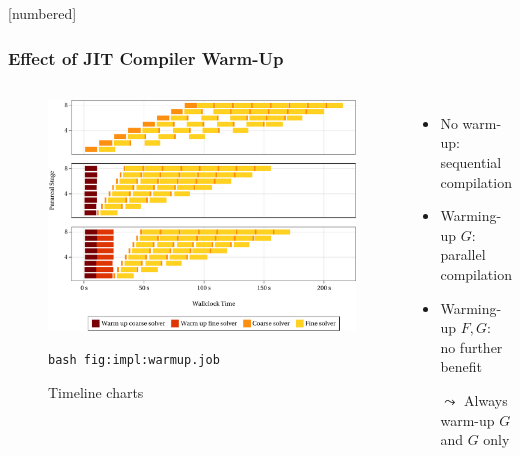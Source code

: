 \begin{frame}[fragile]
  [numbered]
  \frametitle{Effect of JIT Compiler Warm-Up}
  \begin{columns}
    \begin{figure}
    \includegraphics[width=\textwidth]{figures/fig_impl_warmup1.pdf}%
    \renewcommand\thefigure{7.1} %
    \caption{Timeline charts}
    \lstinline!bash fig:impl:warmup.job!
    \end{figure}
    \begin{itemize}
      \item
        No warm-up:\\ sequential compilation
        \vspace{2em}
      \item
        Warming-up $G$:\\ parallel compilation
        \vspace{2em}
      \item
        Warming-up $F,G$:\\ no further benefit
        \vspace{2em}
      \pause
      \item[$\leadsto$]
        Always warm-up $G$\\ and $G$ only
    \end{itemize}
    \vspace{2em}
  \end{columns}
\end{frame}

